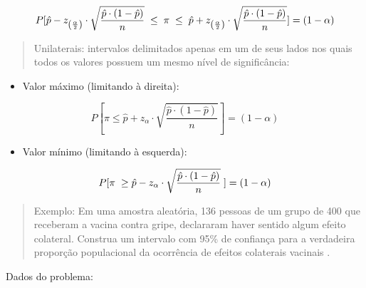 \documentclass[
]{book}
\providecommand{\tightlist}{%
  \setlength{\itemsep}{0pt}\setlength{\parskip}{0pt}}
\begin{document}
\hfill\break

\[
P[\hat{p} - {z}_{\left(\frac{\alpha }{2}\right)} \cdot  \sqrt{\frac{\hat{p} \cdot \left(1- \hat{p} \right)}{n}} \hspace{0.1cm} \le \hspace{0.1cm} \pi \hspace{0.1cm} \le \hspace{0.1cm} \hat{p} + {z}_{\left(\frac{\alpha }{2}\right)} \cdot \sqrt{\frac{\hat{p} \cdot \left(1-\hat{p} \right)}{n}}] = (1-\alpha)
\]

\hfill\break

\begin{quote}
Unilaterais: intervalos delimitados apenas em um de seus lados nos quais todos os valores possuem um mesmo nível de significância:
\end{quote}

\hfill\break

\begin{itemize}
\tightlist
\item
  Valor máximo (limitando à direita):
\end{itemize}

\hfill\break

\[
P[\pi \le \hat{p} + {z}_{\alpha} \cdot  \sqrt{\frac{\hat{p} \cdot \left(1- \hat{p} \right)}{n}} ] = (1- \alpha)
\]

\hfill\break

\begin{itemize}
\tightlist
\item
  Valor mínimo (limitando à esquerda):
\end{itemize}

\hfill\break

\[
P [\pi \hspace{0.1cm} \ge \hat{p} - {z}_{\alpha} \cdot  \sqrt{\frac{\hat{p} \cdot \left(1- \hat{p} \right)}{n}} \hspace{0.1cm}] = (1-\alpha)
\]

\hfill\break

\begin{quote}
Exemplo: Em uma amostra aleatória, 136 pessoas de um grupo de 400 que receberam a vacina contra gripe, declararam haver sentido algum efeito colateral. Construa um intervalo com 95\% de confiança para a verdadeira proporção populacional da ocorrência de efeitos colaterais vacinais .
\end{quote}

\hfill\break

Dados do problema:
\end{document}
